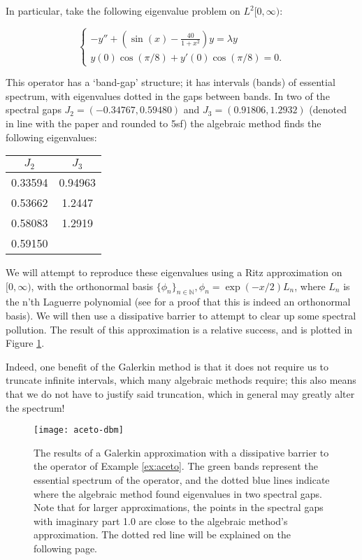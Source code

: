 \documentclass[../main.tex]{subfiles}
\begin{document}
\begin{example}\label{ex:aceto} In particular, take the following eigenvalue
	problem on $L^2[0, \infty)$:

$$ \begin{cases} -y'' + (\sin(x) - \frac{40}{1+x^2})y = \lambda y \\ y(0)
\cos(\pi/8) + y'(0) \cos(\pi/8) = 0. \end{cases} $$

This operator has a `band-gap' structure; it has intervals (bands) of essential
spectrum, with eigenvalues dotted in the gaps between bands. In two of
the spectral gaps $J_2 = (-0.34767, 0.59480)$ and $J_3 = (0.91806,
1.2932)$ (denoted in line with the paper and rounded to 5sf) the
algebraic method finds the following eigenvalues:

\begin{figure*}[h!]
\centering \begin{tabular}{c c}
  $J_2$ & $J_3$ \\
  \hline\hline
  0.33594 & 0.94963 \\
  0.53662 & 1.2447 \\
  0.58083 & 1.2919 \\
  0.59150 & \\
\end{tabular}
\end{figure*}

We will attempt to reproduce these eigenvalues using a
Ritz approximation on $[0, \infty)$, with the orthonormal basis
$\{\phi_n\}_{n \in \mathbb{N}}, \phi_n = \exp(-x/2)L_n$, where $L_n$ is
the n'th Laguerre polynomial (see \cite{szego1975orthogonal} for a proof
that this is indeed an orthonormal basis). We will then use a dissipative
barrier to attempt to clear up some spectral pollution.
The result of this approximation is a relative success, 
and is plotted in Figure \ref{fig:aceto-dbm}.

Indeed, one benefit of the Galerkin method is that it does not require us to
truncate infinite intervals, which many algebraic methods require; this also
means that we do not have to justify said truncation, which in general may
greatly alter the spectrum!
\end{example}

\begin{figure}[p!]
\centering
\texttt{[image: aceto-dbm]}
\caption{The results of a Galerkin approximation with a dissipative
	barrier to the operator of Example \ref{ex:aceto}. The green bands
	represent the essential spectrum of the operator, and the dotted blue
	lines indicate where the algebraic method found eigenvalues in two
	spectral gaps. Note that for larger approximations, the points in the
	spectral gaps with imaginary part 1.0 are close to the algebraic
	method's approximation. The dotted red line will be explained on
  the following page.}
\label{fig:aceto-dbm}
\end{figure}
\end{document}
